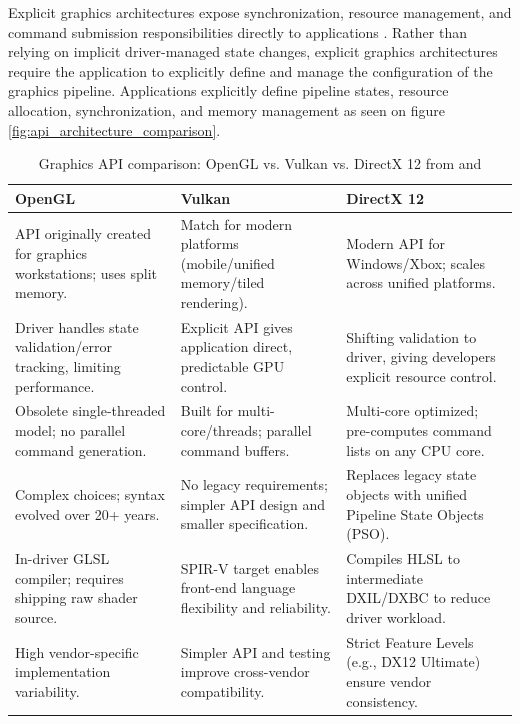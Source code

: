 Explicit graphics architectures expose synchronization, resource management, and command submission responsibilities directly to applications \cite{vulkan14spec2024}.
Rather than relying on implicit driver-managed state changes, explicit graphics architectures require the application to explicitly define and manage the configuration of the graphics pipeline.
Applications explicitly define pipeline states, resource allocation, synchronization, and memory management as seen on figure \ref{fig:api_architecture_comparison}.

\begin{table}[htbp]
\centering
\small %
\renewcommand{\arraystretch}{1.2} %
\begin{tabular}{|p{4.2cm}|p{4.2cm}|p{4.2cm}|}
\hline
\textbf{OpenGL} & \textbf{Vulkan} & \textbf{DirectX 12} \\ 
\hline
API originally created for graphics workstations; uses split memory. & Match for modern platforms (mobile/unified memory/tiled rendering). & Modern API for Windows/Xbox; scales across unified platforms. \\ 
\hline
Driver handles state validation/error tracking, limiting performance. & Explicit API gives application direct, predictable GPU control. & Shifting validation to driver, giving developers explicit resource control. \\ 
\hline
Obsolete single-threaded model; no parallel command generation. & Built for multi-core/threads; parallel command buffers. & Multi-core optimized; pre-computes command lists on any CPU core. \\ 
\hline
Complex choices; syntax evolved over 20+ years. & No legacy requirements; simpler API design and smaller specification. & Replaces legacy state objects with unified Pipeline State Objects (PSO). \\ 
\hline
In-driver GLSL compiler; requires shipping raw shader source. & SPIR-V target enables front-end language flexibility and reliability. & Compiles HLSL to intermediate DXIL/DXBC to reduce driver workload. \\ 
\hline
High vendor-specific implementation variability. & Simpler API and testing improve cross-vendor compatibility. & Strict Feature Levels (e.g., DX12 Ultimate) ensure vendor consistency. \\ 
\hline
\end{tabular}
\caption[Graphics API comparison: OpenGL vs. Vulkan vs. DirectX 12]{Graphics API comparison: OpenGL vs. Vulkan vs. DirectX 12 from \citeauthor{shiraef2016exploratory} and \citeauthor{zoraja2023vanityx}}\label{tab:graphics_api_comparison}
\label{tab:dif_API}
\end{table}

